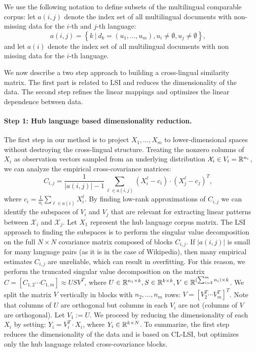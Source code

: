 We use the following notation to define subsets of the multilingual comparable corpus: 
let $a(i,j)$ denote the index set of all multilingual documents with non-missing data 
for the $i$-th and $j$-th language: 
$$a(i,j) = \left\{k~ |~ d_k = (u_1,...,u_m), u_i \neq \emptyset, u_j \neq \emptyset \right\},$$ 
and let $a(i)$ denote the index set of all multilingual documents with non missing data 
for the $i$-th language.

We now describe a two step approach to building a cross-lingual similarity matrix. 
The first part is related to LSI and reduces the dimensionality of the data. The second 
step refines the linear mappings and optimizes the linear dependence between data.

\paragraph{Step 1: Hub language based dimensionality reduction.}
The first step in our method is to project $X_1, \ldots, X_m$ to lower-dimensional spaces 
without destroying the cross-lingual structure. Treating the nonzero columns of $X_i$ as 
observation vectors sampled from an underlying distribution $\mathcal{X}_i \in V_i = \mathbb{R}^{n_i}$, 
we can analyze the empirical cross-covariance matrices: 
$$C_{i,j} = \frac{1}{|a(i,j)|-1 }\sum_{\ell \in a(i,j)} (X_i^{\ell} - c_i)\cdot (X_j^{\ell} - c_j)^T,$$
where $c_i = \frac{1}{a_i} \sum_{\ell \in a(i)}X_i^{\ell}$. By finding low-rank 
approximations of $C_{i,j}$ we can identify the subspaces of $V_i$ and $V_j$ that are 
relevant for extracting linear patterns between $\mathcal{X}_i$ and $\mathcal{X}_j$. 
Let $X_1$ represent the hub language corpus matrix. The LSI approach to finding the subspaces 
is to perform the singular value decomposition on the full $N \times N$ covariance matrix 
composed of blocks $C_{i,j}$. If $|a(i,j)|$ is small for many language pairs (as it is in the 
case of Wikipedia), then many empirical estimates $C_{i,j}$ are unreliable, which can result 
in overfitting. For this reason, we perform the truncated singular value decomposition on the 
matrix $C = [C_{1,2}  \cdots  C_{1,m}] \approx U S V^T$, where 
$U \in \mathbb{R}^{n_1 \times k}, S \in \mathbb{R}^{k \times k}, V \in \mathbb{R}^{(\sum_{i=2}^m n_i) \times k}$. 
We split the matrix $V$ vertically in blocks with 
$n_2, \ldots, n_m$ rows: $V = [V_2^T  \cdots  V_m^T]^T$. 
Note that columns of $U$ are orthogonal but columns in each $V_i$ are not (columns of $V$ 
are orthogonal). Let $V_1 := U$. We proceed by reducing the dimensionality of each $X_i$ by 
setting: $Y_i = V_i^T \cdot X_i$, where $Y_i \in \mathbb{R}^{k\times N}$. To summarize, the first step 
reduces the dimensionality of the data and is based on CL-LSI, but optimizes only the hub language 
related cross-covariance blocks.

